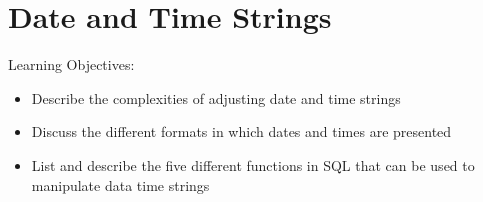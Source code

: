 \documentclass[]{book}
\providecommand{\tightlist}{%
  \setlength{\itemsep}{0pt}\setlength{\parskip}{0pt}}
\theoremstyle{definition}
\theoremstyle{definition}
\theoremstyle{remark}
\begin{document}
\section{Date and Time Strings}\label{date-and-time-strings}

Learning Objectives:

\begin{itemize}
\tightlist
\item
  Describe the complexities of adjusting date and time strings
\item
  Discuss the different formats in which dates and times are presented
\item
  List and describe the five different functions in SQL that can be used
  to manipulate data time strings
\end{itemize}



\backmatter
\printindex
\end{document}
